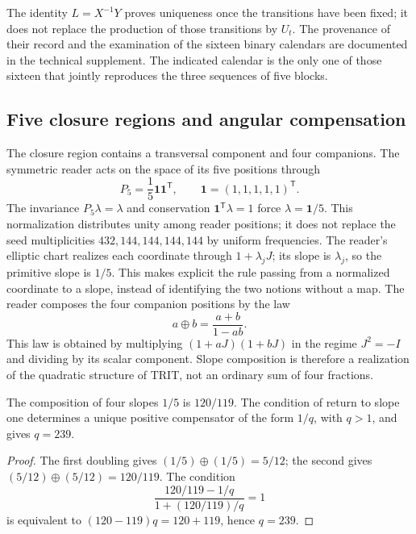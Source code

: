 The identity \(L=X^{-1}Y\) proves uniqueness once the transitions have been fixed; it does not replace the production of those transitions by \(U_t\). The provenance of their record and the examination of the sixteen binary calendars are documented in the technical supplement. The indicated calendar is the only one of those sixteen that jointly reproduces the three sequences of five blocks.

\subsection{Five closure regions and angular compensation}

The closure region contains a transversal component and four companions. The symmetric reader acts on the space of its five positions through
\[
 P_5=\frac15\mathbf1\mathbf1^{\mathsf T},\qquad
 \mathbf1=(1,1,1,1,1)^{\mathsf T}.
\]
The invariance \(P_5\lambda=\lambda\) and conservation \(\mathbf1^{\mathsf T}\lambda=1\) force \(\lambda=\mathbf1/5\). This normalization distributes unity among reader positions; it does not replace the seed multiplicities \(432,144,144,144,144\) by uniform frequencies. The reader's elliptic chart realizes each coordinate through \(1+\lambda_jJ\); its slope is \(\lambda_j\), so the primitive slope is \(1/5\). This makes explicit the rule passing from a normalized coordinate to a slope, instead of identifying the two notions without a map. The reader composes the four companion positions by the law
\begin{equation}
 a\oplus b=\frac{a+b}{1-ab}.
 \label{eq:suma-pendientes}
\end{equation}
This law is obtained by multiplying \((1+aJ)(1+bJ)\) in the regime \(J^2=-I\) and dividing by its scalar component. Slope composition is therefore a realization of the quadratic structure of TRIT, not an ordinary sum of four fractions.

\begin{proposition}
The composition of four slopes \(1/5\) is \(120/119\). The condition of return to slope one determines a unique positive compensator of the form \(1/q\), with \(q>1\), and gives \(q=239\).
\end{proposition}
\begin{proof}
The first doubling gives \((1/5)\oplus(1/5)=5/12\); the second gives \((5/12)\oplus(5/12)=120/119\). The condition
\[
 \frac{120/119-1/q}{1+(120/119)/q}=1
\]
is equivalent to \((120-119)q=120+119\), hence \(q=239\).
\end{proof}

